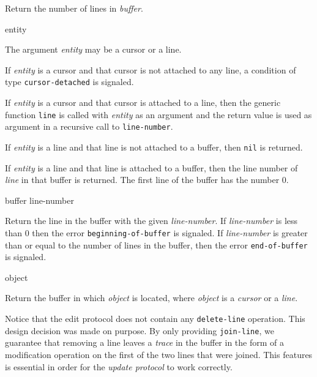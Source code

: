 Return the number of lines in \textit{buffer}.

 {entity}

The argument \textit{entity} may be a cursor or a line.

If \textit{entity} is a cursor and that cursor is not attached to any
line, a condition of type \texttt{cursor-detached} is signaled.

If \textit{entity} is a cursor and that cursor is attached to a line,
then the generic function \texttt{line}  is
called with \textit{entity} as an argument and the return value is
used as argument in a recursive call to \texttt{line-number}.

If \textit{entity} is a line and that line is not attached to a
buffer, then \texttt{nil} is returned.

If \textit{entity} is a line and that line is attached to a buffer,
then the line number of \textit{line} in that buffer is returned.  The
first line of the buffer has the number $0$.

 {buffer line-number}

Return the line in the buffer with the given \textit{line-number}.  If
\textit{line-number} is less than $0$ then the error
\texttt{beginning-of-buffer} is signaled.  If \textit{line-number} is
greater than or equal to the number of lines in the buffer, then the
error \texttt{end-of-buffer} is signaled.

 {object}

Return the buffer in which \textit{object} is located, where
\textit{object} is a \emph{cursor} or a \emph{line}.

Notice that the edit protocol does not contain any
\texttt{delete-line} operation.  This design decision was made on
purpose.  By only providing \texttt{join-line}, we guarantee that
removing a line leaves a \emph{trace} in the buffer in the form of a
modification operation on the first of the two lines that were
joined.  This features is essential in order for the \emph{update
  protocol} to work correctly.
